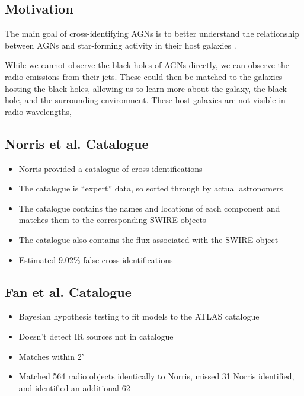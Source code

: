         \subsection{Motivation}
        \label{sec:cross-identification-motivation}

        The main goal of cross-identifying AGNs is to better understand the
        relationship between AGNs and star-forming activity in their host
        galaxies \citep{norris06}.

        While we cannot observe the black holes of AGNs directly, we can observe
        the radio emissions from their jets. These could then be matched to the
        galaxies hosting the black holes, allowing us to learn more about the
        galaxy, the black hole, and the surrounding environment. These host
        galaxies are not visible in radio wavelengths,


        \subsection{Norris et al. Catalogue}
        \label{sec:norris}

            \begin{itemize}
                \item Norris provided a catalogue of cross-identifications
                \item The catalogue is ``expert'' data, so sorted through by actual astronomers
                \item The catalogue contains the names and locations of each component and matches them to the corresponding SWIRE objects
                \item The catalogue also contains the flux associated with the SWIRE object
                \item Estimated $9.02\%$ false cross-identifications
            \end{itemize}

        \subsection{Fan et al. Catalogue}
        \label{sec:fan}

            \begin{itemize}
                \item Bayesian hypothesis testing to fit models to the ATLAS catalogue
                \item Doesn't detect IR sources not in catalogue
                \item Matches within 2'
                \item Matched 564 radio objects identically to Norris, missed 31 Norris identified, and identified an additional 62
            \end{itemize}

